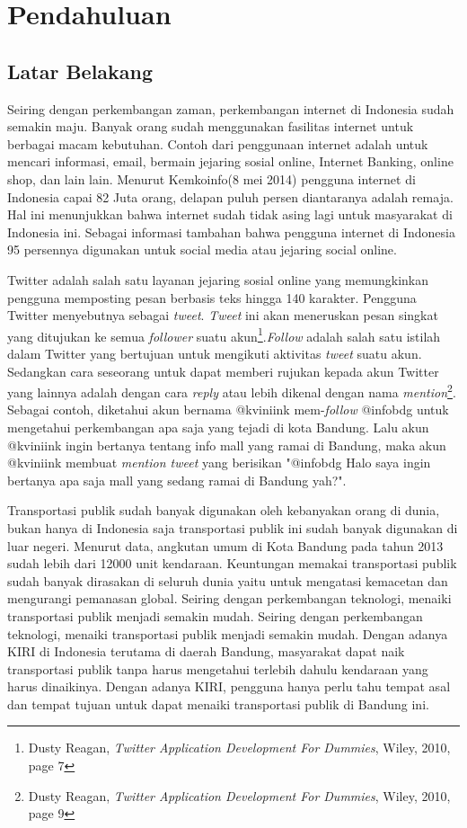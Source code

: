 \chapter{Pendahuluan}
\label{chap:pendahuluan}

\section{Latar Belakang}
\label{sec:latar belakang}

Seiring dengan perkembangan zaman, perkembangan internet di Indonesia sudah semakin maju.  Banyak orang sudah menggunakan fasilitas internet untuk berbagai macam kebutuhan. Contoh dari penggunaan internet adalah untuk mencari informasi, email, bermain jejaring sosial online, Internet Banking, online shop, dan lain lain. Menurut Kemkoinfo\left(8 mei 2014\right)	 pengguna internet di Indonesia capai 82 Juta orang, delapan puluh persen diantaranya adalah remaja. Hal ini menunjukkan bahwa internet sudah tidak asing lagi untuk masyarakat di Indonesia ini. Sebagai informasi tambahan bahwa pengguna internet di Indonesia 95 persennya digunakan untuk social media atau jejaring social online.

Twitter adalah salah satu layanan jejaring sosial online yang memungkinkan pengguna memposting pesan berbasis teks hingga 140 karakter. Pengguna Twitter menyebutnya sebagai \textit{tweet}. \textit{Tweet} ini akan meneruskan pesan singkat yang ditujukan ke semua \textit{follower} suatu akun\footnote{Dusty Reagan, \textit{Twitter Application Development For Dummies}, Wiley, 2010, page 7}.\textit{Follow} adalah salah satu istilah dalam Twitter yang bertujuan untuk mengikuti aktivitas \textit{tweet} suatu akun. Sedangkan cara seseorang untuk dapat memberi rujukan kepada akun Twitter yang lainnya adalah dengan cara \textit{reply} atau lebih dikenal dengan nama \textit{mention}\footnote{Dusty Reagan, \textit{Twitter Application Development For Dummies}, Wiley, 2010, page 9}. Sebagai contoh, diketahui akun bernama @kviniink mem-\textit{follow} @infobdg untuk mengetahui perkembangan apa saja yang tejadi di kota Bandung. Lalu akun @kviniink ingin bertanya tentang info mall yang ramai di Bandung, maka akun @kviniink membuat \textit{mention tweet} yang berisikan "@infobdg Halo saya ingin bertanya apa saja mall yang sedang ramai di Bandung yah?".

Transportasi publik sudah banyak digunakan oleh kebanyakan orang di dunia, bukan hanya di Indonesia saja transportasi publik ini sudah banyak digunakan di luar negeri. Menurut data, angkutan umum di Kota Bandung pada tahun 2013 sudah lebih dari 12000 unit kendaraan. Keuntungan memakai transportasi publik sudah banyak dirasakan di seluruh dunia yaitu untuk mengatasi kemacetan dan mengurangi pemanasan global. Seiring dengan perkembangan teknologi, menaiki transportasi publik menjadi semakin mudah. Seiring dengan perkembangan teknologi, menaiki transportasi publik menjadi semakin mudah. Dengan adanya KIRI di Indonesia terutama di daerah Bandung, masyarakat dapat naik transportasi publik tanpa harus mengetahui terlebih dahulu kendaraan yang harus dinaikinya. Dengan adanya KIRI, pengguna hanya perlu tahu tempat asal dan tempat tujuan untuk dapat menaiki transportasi publik di Bandung ini.

